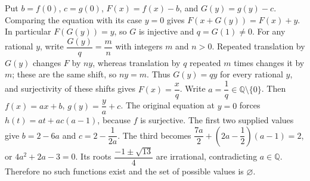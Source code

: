 Put $b=f(0)$, $c=g(0)$, $F(x)=f(x)-b$, and $G(y)=g(y)-c$. Comparing the equation with its case $y=0$ gives $F(x+G(y))=F(x)+y$. In particular $F(G(y))=y$, so $G$ is injective and $q=G(1)\ne0$. For any rational $y$, write $\dfrac{G(y)}{q}=\dfrac{m}{n}$ with integers $m$ and $n>0$. Repeated translation by $G(y)$ changes $F$ by $ny$, whereas translation by $q$ repeated $m$ times changes it by $m$; these are the same shift, so $ny=m$. Thus $G(y)=qy$ for every rational $y$, and surjectivity of these shifts gives $F(x)=\dfrac{x}{q}$. Write $a=\dfrac{1}{q}\in\mathbb Q\setminus\{0\}$. Then $f(x)=ax+b$, $g(y)=\dfrac{y}{a}+c$. The original equation at $y=0$ forces $h(t)=at+ac(a-1)$, because $f$ is surjective. The first two supplied values give $b=2-6a$ and $c=2-\dfrac{1}{2a}$. The third becomes $\dfrac{7a}{2}+(2a-\dfrac{1}{2})(a-1)=2$, or $4a^2+2a-3=0$. Its roots $\dfrac{-1\pm\sqrt{13}}{4}$ are irrational, contradicting $a\in\mathbb Q$. Therefore no such functions exist and the set of possible values is $\boxed{\varnothing}$.
